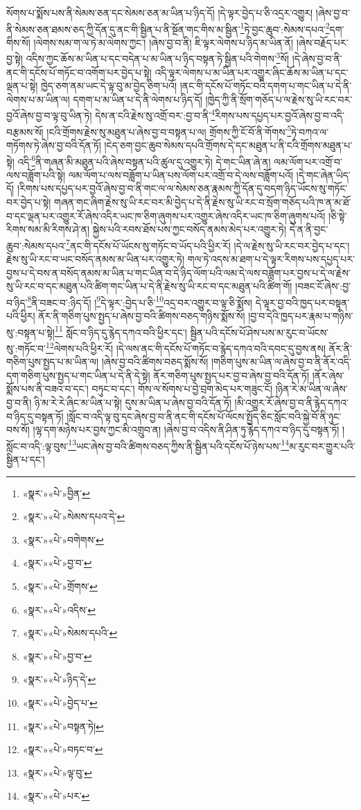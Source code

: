 སོགས་པ་སྨོས་པས་ནི་སེམས་ཅན་དང་སེམས་ཅན་མ་ཡིན་པ་ཉིད་དོ། །དེ་ལྟར་བྱེད་པ་ཅི་འདྲར་འགྱུར། །ཞེས་བྱ་བ་ནི་སེམས་ཅན་ཐམས་ཅད་ཀྱི་དོན་དུ་ནང་གི་སྦྱིན་པ་ནི་སྔོན་གང་གིས་མ་སྦྱིན་\footnote{«སྣར་»«པེ་»བྱིན་}ཏེ་བྱང་ཆུབ་:སེམས་དཔའ་\footnote{«སྣར་»«པེ་»སེམས་དཔའ་དེ་}དག་གིས་སོ། །ལེགས་སམ་ག་ལ་ཏེ་མ་ལེགས་ཀྱང་། །ཞེས་བྱ་བ་ནི། ཇི་ལྟར་ལེགས་པ་ཉིད་མ་ཡིན་ནོ། །ཞེས་བརྗོད་པར་བྱ་སྟེ། འདིས་ཀྱང་ཆོས་མ་ཡིན་པ་དང་བདེན་པ་མ་ཡིན་པ་ཉིད་བསྟན་ཏེ་སྦྱིན་པའི་གེགས་\footnote{«སྣར་»«པེ་»བགེགས་}སོ། །དེ་ཞེས་བྱ་བ་ནི་ནང་གི་དངོས་པོ་གཏོང་བ་འགོག་པར་བྱེད་པ་སྟེ། འདི་ལྟར་ལེགས་པ་མ་ཡིན་པར་འགྱུར་ཞིང་ཆོས་མ་ཡིན་པ་དང་ལྡན་པ་སྟེ། ཁྱེད་ཅག་ནམ་ཡང་དེ་ལྟ་བུ་མ་བྱེད་ཅིག་པའོ། །ནང་གི་དངོས་པོ་གཏོང་བའི་དགག་པ་གང་ཡིན་པ་དེ་ནི་ལེགས་པ་མ་ཡིན་ལ། དགག་པ་མ་ཡིན་པ་དེ་ནི་ལེགས་པ་ཉིད་དོ། །ཁྱེད་ཀྱི་ནི་སྲོག་གཅོད་པ་ལ་རྗེས་སུ་ཡི་རང་བར་བྱའོ་ཞེས་བྱ་བ་ལྟ་བུ་ཡིན་ཏེ། དེས་ན་ངའི་རྗེས་སུ་འགྲོ་བར་:བྱ་བ་ནི་\footnote{«སྣར་»«པེ་»བྱ་བ་}རིགས་པས་དཔྱད་པར་བྱའོ་ཞེས་བྱ་བ་འདི་བརྩམས་སོ། །ངའི་གྲོགས་རྗེས་སུ་མཐུན་པ་ཞེས་བྱ་བ་བསྟན་པ་ལ། གྲོགས་ཀྱི་ངོ་བོ་ནི་གོགས་\footnote{«སྣར་»«པེ་»གྲོགས་}ཏེ་བཀའ་ལ་གཏོགས་ཏེ་ཞེས་བྱ་བའི་དོན་ཏོ། །ངེད་ཅག་བྱང་ཆུབ་སེམས་དཔའི་གྲོགས་དེ་དང་མཐུན་པ་ནི་ངའི་གྲོགས་མཐུན་པ་སྟེ། འདི་\footnote{«སྣར་»«པེ་»འདིས་}ནི་གཞན་མི་མཐུན་པའི་ཞེས་བསྟན་པའི་ཚུལ་དུ་འགྱུར་ཏེ། དེ་གང་ཡིན་ཞེ་ན། ལམ་ལོག་པར་འགྲོ་བ་ལས་བཟློག་པའི་སྟེ། ལམ་ལོག་པ་ལས་བཟློག་པ་ཡིན་པས་ལོག་པར་འགྲོ་བ་དེ་ལས་བཟློག་པའོ། །དེ་གང་ཞེན་ཡིད་དོ། །རིགས་པས་དཔྱད་པར་བྱའོ་ཞེས་བྱ་བ་ནི་གང་ལ་ལ་སེམས་ཅན་རྣམས་ཀྱི་དོན་དུ་བདག་ཉིད་ཡོངས་སུ་གཏོང་བར་བྱེད་པ་སྟེ། གཞན་གང་ཞིག་རྗེས་སུ་ཡི་རང་བར་མི་བྱེད་པ་དེ་ནི་རྗེས་སུ་ཡི་རང་བ་སྲོག་གཅོད་པའི་ཁ་ན་མ་ཐོ་བ་དང་ལྡན་པར་འགྱུར་རོ་ཞེས་འདིར་ཡང་ཁ་ཅིག་ཞུགས་པར་འགྱུར་ཞེས་འདིར་ཡང་ཁ་ཅིག་ཞུགས་པའོ། །ཅི་སྟེ་རིགས་སམ་མི་རིགས་ཤེ་ན། སྐྱེས་པའི་རབས་ཐོས་པས་ཀྱང་བསོད་ནམས་མེད་པར་འགྱུར་ཏེ། དེ་ན་ནི་བྱང་ཆུབ་:སེམས་དཔའ་\footnote{«སྣར་»«པེ་»སེམས་དཔའི་}ནང་གི་དངོས་པོ་ཡོངས་སུ་གཏོང་བ་ཡོད་པའི་ཕྱིར་རོ། །དེ་ལ་རྗེས་སུ་ཡི་རང་བར་བྱེད་པ་དང་། རྗེས་སུ་ཡི་རང་བ་ཡང་བསོད་ནམས་མ་ཡིན་པར་འགྱུར་ཏེ། གལ་ཏེ་འདས་མ་ཐག་པ་དེ་ལྟར་རིགས་པས་དཔྱད་པར་བྱས་པ་དེ་བས་ན་བསོད་ནམས་མ་ཡིན་པ་གང་ཡིན་བ་དེ་ཉིད་ལོག་པའི་ལམ་དེ་ལས་བཟློག་པར་བྱས་པ་དེ་ལ་རྗེས་སུ་ཡི་རང་བ་དང་མཐུན་པའི་ཚིག་གང་ཡིན་པ་དེ་ནི་རྗེས་སུ་ཡི་རང་བ་དང་མཐུན་པའི་ཚིག་གོ། །བཟང་ངོ་ཞེས་:བྱ་བ་ཉིད་\footnote{«སྣར་»«པེ་»བྱ་བ་}ནི་བཟང་བ་:ཉིད་དོ། །\footnote{«སྣར་»«པེ་»ཉིད་དེ་}དེ་ལྟར་:བྱེད་པ་ཅི་\footnote{«སྣར་»«པེ་»བྱེད་པ་}འདྲ་བར་འགྱུར་བ་ལྟ་ཅི་སྨོས། དེ་ལྟར་བྱ་བའི་ཁྱད་པར་བསྟན་པའི་ཕྱིར། ནོར་ནི་གཅིག་པུས་སྤྱད་པ་ཞེས་བྱ་བའི་ཚིགས་བཅད་གཉིས་སྨོས་སོ། །བྱ་བ་དེའི་ཁྱད་པར་རྣམ་པ་གཉིས་སུ་:བསྟན་པ་སྟེ།\footnote{«སྣར་»«པེ་»བསྟན་ཏེ།} སློང་བ་ཉིད་དུ་རྙེད་དཀའ་བའི་ཕྱིར་དང་། སྦྱིན་པའི་དངོས་པོ་ཤེས་པས་མ་རུང་བ་ཡོངས་སུ་:གཏོང་བ་\footnote{«སྣར་»«པེ་»བཏང་བ་}ལེགས་པའི་ཕྱིར་རོ། །དེ་ལས་ནང་གི་དངོས་པོ་གཏོང་བ་རྙེད་དཀའ་བའི་དབང་དུ་བྱས་ནས། ནོར་ནི་གཅིག་པུས་སྤྱད་པ་མ་ཡིན་ལ། །ཞེས་བྱ་བའི་ཚིགས་བཅད་སྨོས་སོ། །གཅིག་པུས་མ་ཡིན་ལ་ཞེས་བྱ་བ་ནི་ནོར་འདི་དག་གཅིག་པུས་སྤྱད་པ་གང་ཡིན་པ་དེ་ནི་དེ་སྟེ། ནོར་གཅིག་པུས་སྤྱད་པར་བྱ་བ་ཞེས་བྱ་བའི་དོན་ཏོ། །ནོར་ཞེས་སྨོས་པས་ནི་བཟའ་བ་དང་། བཏུང་བ་དང་། གོས་ལ་སོགས་པ་བྱེ་བྲག་མེད་པར་གཟུང་ངོ། །ཉིན་རེ་མ་ཡིན་ལ་ཞེས་བྱ་བ་ནི། ཉི་མ་རེ་རེ་ཞིང་མ་ཡིན་པ་སྟེ། དུས་མ་ཡིན་པ་ཞེས་བྱ་བའི་དོན་ཏོ། །མི་འགྱུར་རོ་ཞེས་བྱ་བ་ནི་རྙེད་དཀའ་བ་ཉིད་དུ་བསྟན་ཏོ། །སློང་བ་འདི་ལྟ་བུ་དང་ཞེས་བྱ་བ་ནི་ནང་གི་དངོས་པོ་ལོངས་སྤྱོད་ཅིང་སློང་བའི་སྐྱེ་བོ་ནི་ཉུང་བས་སོ། །ལྷ་དག་མཉེས་པར་བྱས་ཀྱང་མི་འགྲུབ་ན། །ཞེས་བྱ་བ་འདིས་ནི་ཤིན་ཏུ་རྙེད་དཀའ་བ་ཉིད་དུ་བསྟན་ཏོ། །སློང་བ་འདི་:ལྟ་བུས་\footnote{«སྣར་»«པེ་»ལྟ་བུ་}ཡང་ཞེས་བྱ་བའི་ཚིགས་བཅད་ཀྱིས་ནི་སྦྱིན་པའི་དངོས་པོ་ཉེས་པས་\footnote{«སྣར་»«པེ་»པར་}མ་རུང་བར་གྱུར་པའི་སྦྱིན་པ་དང་། 